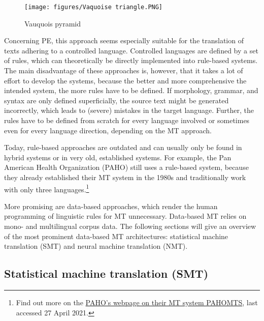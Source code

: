\begin{figure} 
\texttt{[image: figures/Vaquoise triangle.PNG]}
\caption{Vauquois pyramid \citep{vauquois1968survey}}
\label{fig:key:4:1}
\end{figure}


\largerpage[1.5]
Concerning PE, this approach seems especially suitable for the translation of texts adhering to a controlled language. Controlled languages are defined by a set of rules, which can theoretically be directly implemented into rule-based systems. The main disadvantage of these approaches is, however, that it takes a lot of effort to develop the systems, because the better and more comprehensive the intended system, the more rules have to be defined. If morphology, grammar, and syntax are only defined superficially, the source text might be generated incorrectly, which leads to (severe) mistakes in the target language. Further, the rules have to be defined from scratch for every language involved or sometimes even for every language direction, depending on the MT approach. 

Today, rule-based approaches are outdated and can usually only be found in hybrid systems or in very old, established systems. For example, the Pan American Health Organization (PAHO) still uses a rule-based system, because they already established their MT system in the 1980s and traditionally work with only three languages.\footnote{Find out more on the \href{https://www.paho.org/hq/index.php?option=com_content&view=article&id=14762:machine-translation-at-the-pan-american-health-organization&Itemid=1896&lang=en}{PAHO's webpage on their MT system PAHOMTS}, last accessed 27 April 2021.}\clearpage


More promising are data-based approaches, which render the human programming of linguistic rules for MT unnecessary. Data-based MT relies on mono- and multilingual corpus data. The following sections will give an overview of the most prominent data-based MT architectures: statistical machine translation (SMT) and neural machine translation (NMT).



\subsection{Statistical machine translation (SMT)}\label{sec:3:2:2}

